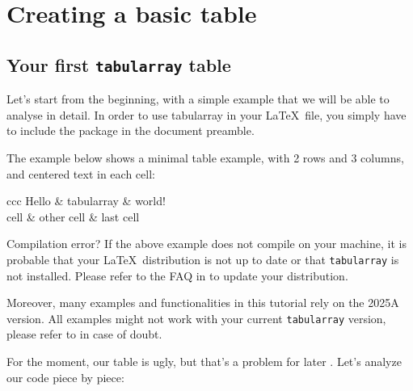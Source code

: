 \chapter{Creating a basic table}\label{sec:basic}

\section{Your first \texttt{tabularray} table}
Let's start from the beginning, with a simple example that we will be able to analyse in detail. 
In order to use tabularray in your \LaTeX\ file, you simply have to include the package in the document preamble. 


The example below shows a minimal table example, with 2 rows and 3 columns, and centered text in each cell:

\begin{Code}
\begin{tblr}{ccc}
	Hello & tabularray & world! \\
	cell & other cell & last cell \\
\end{tblr}
\end{Code}

\begin{warningbox}{Compilation error?}
If the above example does not compile on your machine, it is probable that your \LaTeX\ distribution is not up to date or that \texttt{tabularray} is not installed. Please refer to the FAQ in  to update your distribution.

Moreover, many examples and functionalities in this tutorial rely on the 2025A version. All examples might not work with your current \texttt{tabularray} version, please refer to  in case of doubt.
\end{warningbox}

For the moment, our table is ugly, but that's a problem for later . Let's analyze our code piece by piece:

